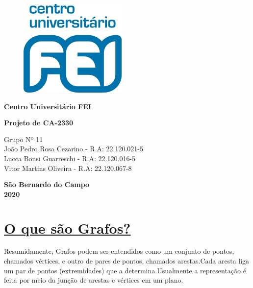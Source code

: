 \documentclass{article}
\begin{document}
\begin{titlepage}
	\begin{figure}[H]
		\centering
		\includegraphics[width=0.1\linewidth]{Figuras/logofei}
		\label{fig:logofei}
	\end{figure}
	
	\begin{center}
		{\large \textbf{Centro Universitário FEI} }
	\end{center}
	
	\vspace*{3cm}
	
	\begin{center}
		{\Large {\bf{ Projeto de CA-2330 \\ 
					\vspace*{0.5cm}{\large Relatório - Parte 1}}}}
	\end{center}\vspace*{5cm}
	
	\begin{center}
		Grupo Nº 11 \vspace*{0.2cm} \\ João Pedro Rosa Cezarino - R.A: 22.120.021-5  \\ Lucca Bonsi Guarreschi - R.A: 22.120.016-5  \\ Vitor Martins Oliveira - R.A: 22.120.067-8
	\end{center}
	
	\vspace*{7cm}
	\begin{center} \textbf{São Bernardo do Campo \\ 2020}\end{center}
	
\end{titlepage}
	\newpage
	\setcounter{page}{1} %
	
	\section{{\Large \underline{O que são Grafos?}}}
		Resumidamente, Grafos podem ser entendidos como um conjunto de pontos, chamados vértices, e outro de pares de pontos, chamados arestas.Cada aresta liga um par de pontos (extremidades) que a determina.Usualmente a representação é feita por meio da junção de arestas e vértices em um plano.
		
\end{document}

